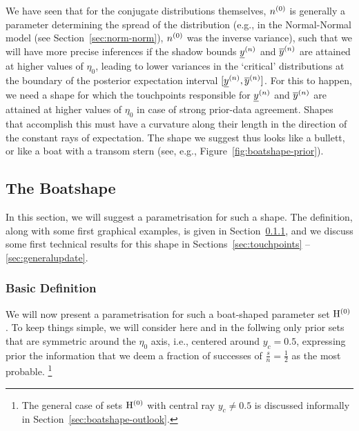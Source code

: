 We have seen that for the conjugate distributions themselves,
$n^{(0)}$ is generally a parameter determining the spread of the distribution
(e.g., in the Normal-Normal model (see Section~\ref{sec:norm-norm}), $n^{(0)}$ was the inverse variance),
such that we will have more precise inferences if the shadow bounds $\underline{y}^{(n)}$ and $\overline{y}^{(n)}$
are attained at higher values of $\eta_0$, leading to lower variances in the
`critical' distributions at the boundary of the posterior expectation interval $[\underline{y}^{(n)},\overline{y}^{(n)}]$.
For this to happen, we need a shape for which the touchpoints responsible for $\underline{y}^{(n)}$ and $\overline{y}^{(n)}$
are attained at higher values of $\eta_0$ in case of strong prior-data agreement.
Shapes that accomplish this must have a curvature along their length in the direction
of the constant rays of expectation.
The shape we suggest thus looks like a bullett, or like a boat with a transom stern
(see, e.g., Figure~\ref{fig:boatshape-prior}).



\subsection{The Boatshape}
\label{sec:boatshape-2}

In this section, %
we will suggest a parametrisation for such a shape.
The definition, along with some first graphical examples, is given in Section~\ref{sec:basicdefboat},
and we discuss some first technical results for this shape in Sections~\ref{sec:touchpoints} -- \ref{sec:generalupdate}.

\subsubsection{Basic Definition}
\label{sec:basicdefboat}

We will now present a parametrisation for such a boat-shaped parameter set $\mathrm{H}^{(0)}$.
To keep things simple, we will consider here and in the follwing only prior sets
that are symmetric around the $\eta_0$ axis, i.e., centered around $y_c = 0.5$,
expressing prior the information that we deem a fraction of successes of $\frac{s}{n} = \frac{1}{2}$
as the most probable.%
\footnote{The general case of sets $\mathrm{H}^{(0)}$ with central ray $y_c \neq 0.5$
is discussed informally in Section~\ref{sec:boatshape-outlook}.}

